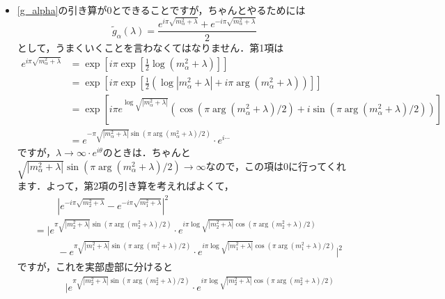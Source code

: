 \documentclass[a4paper,pdflatex,ja=standard]{bxjsarticle}
\begin{document}
\begin{itemize}
  \item 
  \eqref{g_alpha}の引き算が$0$とできることですが，ちゃんとやるためには
  \begin{equation}
    \tilde{g}_{\alpha}(\lambda)
    =
    \frac{e^{i\pi\sqrt{m_{\alpha}^2+\lambda}}+e^{-i\pi\sqrt{m_{\alpha}^2+\lambda}}}{2}
  \end{equation}
  として，うまくいくことを言わなくてはなりません．第1項は
  \begin{align*}
    e^{i\pi\sqrt{m_{\alpha}^2+\lambda}}
    &=
    \exp\left[  
      i\pi \exp\left[ \frac{1}{2}\log (m_{\alpha}^2+\lambda) \right]
    \right]
    \nonumber
    \\
    &=
    \exp\left[  
      i\pi \exp\left[ 
        \frac{1}{2}(\log |m_{\alpha}^2+\lambda|+i\pi\arg(m_{\alpha}^2+\lambda)) \right]
    \right]
    \nonumber
    \\
    &=
    \exp\left[  
      i\pi e^{\log\sqrt{|m_{\alpha}^2+\lambda|}}(\cos(\pi\arg(m_{\alpha}^2+\lambda)/2)+i\sin(\pi\arg(m_{\alpha}^2+\lambda)/2))
    \right]
    \nonumber
    \\
    &=
    e^{-\pi \sqrt{|m_{\alpha}^2+\lambda|}\sin(\pi\arg(m_{\alpha}^2+\lambda)/2)}\cdot e^{i\cdots}
  \end{align*}
  ですが，$\lambda\rightarrow\infty\cdot e^{i\theta}$のときは．ちゃんと$\sqrt{|m_{\alpha}^2+\lambda|}\sin(\pi\arg(m_{\alpha}^2+\lambda)/2)\rightarrow\infty$なので，この項は$0$に行ってくれます．よって，第2項の引き算を考えればよくて，
  \begin{align*}
    &\hspace{1cm}
    |
    e^{-i\pi\sqrt{m_{2}^2+\lambda}}
    -
    e^{-i\pi\sqrt{m_{1}^2+\lambda}}
    |^2
    \nonumber
    \\
    &=
    |
    e^{\pi \sqrt{|m_{2}^2+\lambda|}\sin(\pi\arg(m_{2}^2+\lambda)/2)}\cdot e^{i\pi\log\sqrt{|m_{2}^2+\lambda|}\cos(\pi\arg(m_{2}^2+\lambda)/2)}
    \nonumber
    \\
    &\hspace{1cm}
    -
    e^{\pi \sqrt{|m_{1}^2+\lambda|}\sin(\pi\arg(m_{1}^2+\lambda)/2)}\cdot e^{i\pi\log\sqrt{|m_{1}^2+\lambda|}\cos(\pi\arg(m_{1}^{2}+\lambda)/2)}
    |^2
  \end{align*}
  ですが，これを実部虚部に分けると
  \begin{align}
    &\hspace{1cm}
    |
    e^{\pi \sqrt{|m_{2}^2+\lambda|}\sin(\pi\arg(m_{2}^2+\lambda)/2)}\cdot e^{i\pi\log\sqrt{|m_{2}^2+\lambda|}\cos(\pi\arg(m_{2}^2+\lambda)/2)}
    \nonumber
    \\

\end{align}
\end{itemize}
\end{document}
